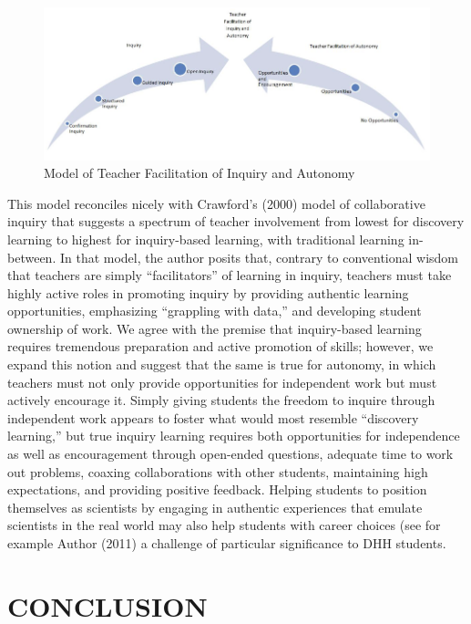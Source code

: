 \documentclass[11.5pt]{sig-alternate} %
\begin{document}
\begin{large}
\begin{figure}[t]
    \centering
    \includegraphics[width=1\textwidth]{Figure1.png}
    \caption{Model of Teacher Facilitation of Inquiry and Autonomy}
\end{figure}

This model reconciles nicely with Crawford’s (2000) model of collaborative inquiry that suggests a spectrum of teacher involvement from lowest for discovery learning to highest for inquiry-based learning, with traditional learning in-be\-tween. In that model, the author posits that, contrary to conventional wisdom that teachers are simply “facilitators” of learning in inquiry, teachers must take highly active roles in promoting inquiry by providing authentic learning opportunities, emphasizing “grappling with data,” and developing student ownership of work.   We agree with the premise that inquiry-based learning requires tremendous preparation and active promotion of skills; however, we expand this notion and suggest that the same is true for autonomy, in which teachers must not only provide opportunities for independent work but must actively encourage it.  Simply giving students the freedom to inquire through independent work appears to foster what would most resemble “discovery learning,” but true inquiry learning requires both opportunities for independence as well as encouragement through open-ended questions, adequate time to work out problems, coaxing collaborations with other students, maintaining high expectations, and providing positive feedback.  Helping students to position themselves as scientists by engaging in authentic experiences that emulate scientists in the real world may also help students with career choices (see for example Author (2011) a challenge of particular significance to DHH students. 

\section*{CONCLUSION}


\end{large}
\end{document}
